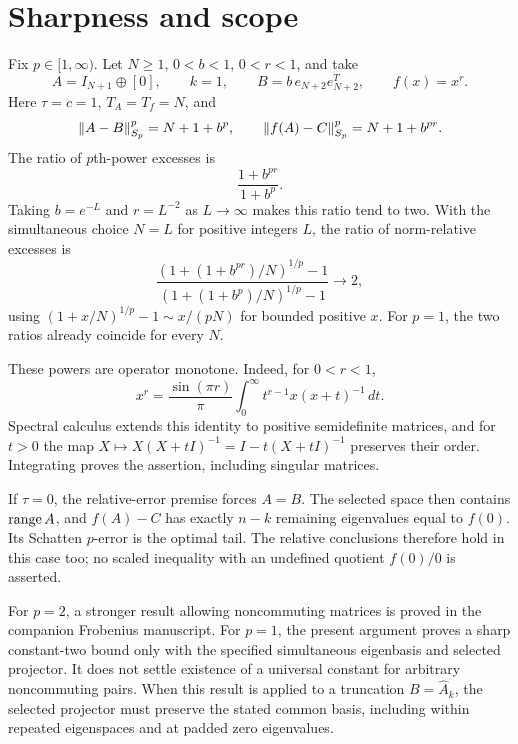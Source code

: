 \documentclass[11pt]{article}
\begin{document}
\section{Sharpness and scope}
Fix $p\in[1,\infty)$. Let $N\ge1$, $0<b<1$, $0<r<1$, and take
\[
 A=I_{N+1}\oplus[0],\qquad k=1,\qquad
 B=b\,e_{N+2}e_{N+2}^T,\qquad f(x)=x^r.
\]
Here $\tau=c=1$, $T_A=T_f=N$, and
\[
 \left\lVert A-B\right\rVert_{S_p}^p=N+1+b^p,\qquad
 \left\lVert f(A)-C\right\rVert_{S_p}^p=N+1+b^{pr}.
\]
The ratio of $p$th-power excesses is
\[
 \frac{1+b^{pr}}{1+b^p}.
\]
Taking $b=e^{-L}$ and $r=L^{-2}$ as $L\to\infty$ makes this ratio tend to two. With the simultaneous choice $N=L$ for positive integers $L$, the ratio of norm-relative excesses is
\[
 \frac{(1+(1+b^{pr})/N)^{1/p}-1}
 {(1+(1+b^p)/N)^{1/p}-1}\longrightarrow2,
\]
using $(1+x/N)^{1/p}-1\sim x/(pN)$ for bounded positive $x$. For $p=1$, the two ratios already coincide for every $N$.

These powers are operator monotone. Indeed, for $0<r<1$,
\[
 x^r=\frac{\sin(\pi r)}{\pi}
 \int_0^\infty t^{r-1}x(x+t)^{-1}\,dt.
\]
Spectral calculus extends this identity to positive semidefinite matrices, and for $t>0$ the map
$X\mapsto X(X+tI)^{-1}=I-t(X+tI)^{-1}$ preserves their order. Integrating proves the assertion, including singular matrices.

If $\tau=0$, the relative-error premise forces $A=B$. The selected space then contains $\operatorname{range} A$, and $f(A)-C$ has exactly $n-k$ remaining eigenvalues equal to $f(0)$. Its Schatten $p$-error is the optimal tail. The relative conclusions therefore hold in this case too; no scaled inequality with an undefined quotient $f(0)/0$ is asserted.

For $p=2$, a stronger result allowing noncommuting matrices is proved in the companion Frobenius manuscript. For $p=1$, the present argument proves a sharp constant-two bound only with the specified simultaneous eigenbasis and selected projector. It does not settle existence of a universal constant for arbitrary noncommuting pairs. When this result is applied to a truncation $B=\widehat A_k$, the selected projector must preserve the stated common basis, including within repeated eigenspaces and at padded zero eigenvalues.
\end{document}
